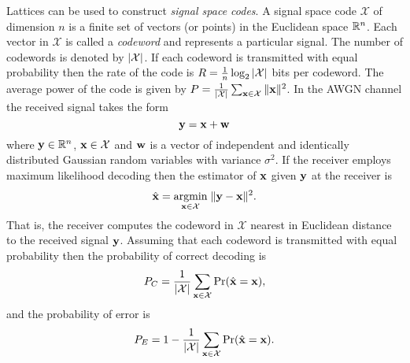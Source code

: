 \documentclass[draftcls, onecolumn, 11pt]{IEEEtran}
\begin{document}
\newcommand{\calX}{\mathcal X}
Lattices can be used to construct \emph{signal space codes}.  A signal space code $\calX$ of dimension $n$ is a finite set of vectors (or points) in the Euclidean space ${\mathbb R}^n$.  Each vector in $\calX$ is called a \emph{codeword} and represents a particular signal.  The number of codewords is denoted by $\abs{\calX}$.  If each codeword is transmitted with equal probability then the rate of the code is $R = \frac{1}{n}\log_2\abs{\calX}$ bits per codeword. The average power of the code is given by $P = \frac{1}{\abs{\calX}}\sum_{\xbf \in \calX}\|\xbf\|^2$.  In the AWGN channel the received signal takes the form
\[
\mathbf{y} = \mathbf{x} + \mathbf{w}
\]
where $\mathbf{y} \in {\mathbb R}^n$, $\xbf \in \calX$ and $\mathbf{w}$ is a vector of independent and identically distributed Gaussian random variables with variance $\sigma^2$.  If the receiver employs maximum likelihood decoding then the estimator of $\mathbf{x}$ given $\mathbf{y}$ at the receiver is
\begin{equation}\label{eq:mldecoder}
\hat{\xbf} = \underset{\xbf \in \calX}{\operatorname{argmin}}\;\| \ybf - \xbf \|^2.
\end{equation}
That is, the receiver computes the codeword in $\calX$ nearest in Euclidean distance to the received signal $\mathbf{y}$.  Assuming that each codeword is transmitted with equal probability then the probability of correct decoding is
\[
P_C =\frac{1}{\abs{\calX}}\sum_{\xbf \in \calX} \prob( \hat{\xbf} = \xbf ),
\]
and the probability of error is
\[
P_E = 1 - \frac{1}{\abs{\calX}} \sum_{\xbf \in \calX} \prob(
\hat{\xbf} = \xbf ).
\]
\end{document}
